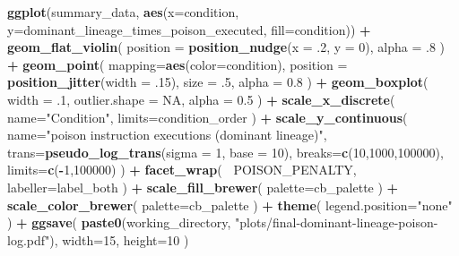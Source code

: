 \documentclass[]{book}
\newenvironment{Shaded}{\begin{snugshade}}{\end{snugshade}}
\newcommand{\DataTypeTok}[1]{\textcolor[rgb]{0.13,0.29,0.53}{#1}}
\newcommand{\DecValTok}[1]{\textcolor[rgb]{0.00,0.00,0.81}{#1}}
\newcommand{\FloatTok}[1]{\textcolor[rgb]{0.00,0.00,0.81}{#1}}
\newcommand{\KeywordTok}[1]{\textcolor[rgb]{0.13,0.29,0.53}{\textbf{#1}}}
\newcommand{\NormalTok}[1]{#1}
\newcommand{\OperatorTok}[1]{\textcolor[rgb]{0.81,0.36,0.00}{\textbf{#1}}}
\newcommand{\OtherTok}[1]{\textcolor[rgb]{0.56,0.35,0.01}{#1}}
\newcommand{\StringTok}[1]{\textcolor[rgb]{0.31,0.60,0.02}{#1}}
\begin{document}
\begin{Shaded}
\begin{Highlighting}[]
\KeywordTok{ggplot}\NormalTok{(summary_data, }\KeywordTok{aes}\NormalTok{(}\DataTypeTok{x=}\NormalTok{condition, }\DataTypeTok{y=}\NormalTok{dominant_lineage_times_poison_executed, }\DataTypeTok{fill=}\NormalTok{condition)) }\OperatorTok{+}
\StringTok{  }\KeywordTok{geom_flat_violin}\NormalTok{(}
    \DataTypeTok{position =} \KeywordTok{position_nudge}\NormalTok{(}\DataTypeTok{x =} \FloatTok{.2}\NormalTok{, }\DataTypeTok{y =} \DecValTok{0}\NormalTok{),}
    \DataTypeTok{alpha =} \FloatTok{.8}
\NormalTok{  ) }\OperatorTok{+}
\StringTok{  }\KeywordTok{geom_point}\NormalTok{(}
    \DataTypeTok{mapping=}\KeywordTok{aes}\NormalTok{(}\DataTypeTok{color=}\NormalTok{condition),}
    \DataTypeTok{position =} \KeywordTok{position_jitter}\NormalTok{(}\DataTypeTok{width =} \FloatTok{.15}\NormalTok{),}
    \DataTypeTok{size =} \FloatTok{.5}\NormalTok{,}
    \DataTypeTok{alpha =} \FloatTok{0.8}
\NormalTok{  ) }\OperatorTok{+}
\StringTok{  }\KeywordTok{geom_boxplot}\NormalTok{(}
    \DataTypeTok{width =} \FloatTok{.1}\NormalTok{,}
    \DataTypeTok{outlier.shape =} \OtherTok{NA}\NormalTok{,}
    \DataTypeTok{alpha =} \FloatTok{0.5}
\NormalTok{  ) }\OperatorTok{+}
\StringTok{  }\KeywordTok{scale_x_discrete}\NormalTok{(}
    \DataTypeTok{name=}\StringTok{"Condition"}\NormalTok{,}
    \DataTypeTok{limits=}\NormalTok{condition_order}
\NormalTok{  ) }\OperatorTok{+}
\StringTok{  }\KeywordTok{scale_y_continuous}\NormalTok{(}
    \DataTypeTok{name=}\StringTok{"poison instruction executions (dominant lineage)"}\NormalTok{,}
    \DataTypeTok{trans=}\KeywordTok{pseudo_log_trans}\NormalTok{(}\DataTypeTok{sigma =} \DecValTok{1}\NormalTok{, }\DataTypeTok{base =} \DecValTok{10}\NormalTok{),}
    \DataTypeTok{breaks=}\KeywordTok{c}\NormalTok{(}\DecValTok{10}\NormalTok{,}\DecValTok{1000}\NormalTok{,}\DecValTok{100000}\NormalTok{),}
    \DataTypeTok{limits=}\KeywordTok{c}\NormalTok{(}\OperatorTok{-}\DecValTok{1}\NormalTok{,}\DecValTok{100000}\NormalTok{)}
\NormalTok{  ) }\OperatorTok{+}
\StringTok{  }\KeywordTok{facet_wrap}\NormalTok{(}
    \OperatorTok{~}\NormalTok{POISON_PENALTY,}
    \DataTypeTok{labeller=}\NormalTok{label_both}
\NormalTok{  ) }\OperatorTok{+}
\StringTok{  }\KeywordTok{scale_fill_brewer}\NormalTok{(}
    \DataTypeTok{palette=}\NormalTok{cb_palette}
\NormalTok{  ) }\OperatorTok{+}
\StringTok{  }\KeywordTok{scale_color_brewer}\NormalTok{(}
    \DataTypeTok{palette=}\NormalTok{cb_palette}
\NormalTok{  ) }\OperatorTok{+}
\StringTok{  }\KeywordTok{theme}\NormalTok{(}
    \DataTypeTok{legend.position=}\StringTok{"none"}
\NormalTok{  ) }\OperatorTok{+}
\StringTok{  }\KeywordTok{ggsave}\NormalTok{(}
    \KeywordTok{paste0}\NormalTok{(working_directory, }\StringTok{"plots/final-dominant-lineage-poison-log.pdf"}\NormalTok{),}
    \DataTypeTok{width=}\DecValTok{15}\NormalTok{,}
    \DataTypeTok{height=}\DecValTok{10}
\NormalTok{  )}
\end{Highlighting}
\end{Shaded}
\end{document}
